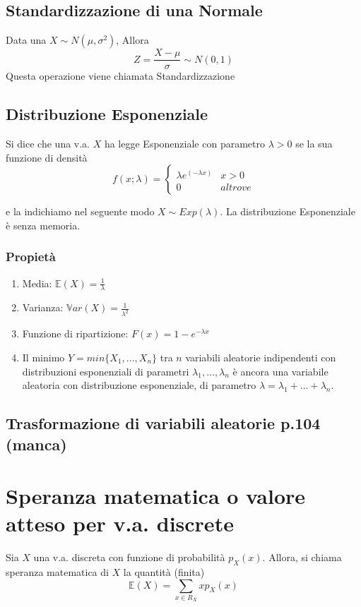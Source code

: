 \documentclass[a4paper]{report}
\begin{document}
  \subsection{Standardizzazione di una Normale}
  Data una $X \sim N(\mu,\sigma^2)$, Allora
  \[ Z = \frac{X-\mu}{\sigma} \sim N(0,1) \]
  Questa operazione viene chiamata Standardizzazione


  \subsection{Distribuzione Esponenziale}
  Si dice che una v.a. $X$ ha legge Esponenziale con parametro $\lambda >0$ se la sua funzione di densità
  \[
    f(x;\lambda) =
    \begin{cases}
      \lambda e^{(-\lambda x)} & x > 0 \\
      0 & altrove
    \end{cases}
  \]

  e la indichiamo nel seguente modo $X \sim Exp(\lambda)$. La distribuzione Esponenziale è senza memoria.
  \subsubsection{Propietà}
  \begin{enumerate}
    \item Media: $\mathbb{E}(X) = \frac{1}{\lambda}$
    \item Varianza: $\mathbb{V}ar(X) = \frac{1}{\lambda^2}$
    \item Funzione di ripartizione: $F(x) = 1-e^{-\lambda x}$
    \item Il minimo $Y = min\{X_1,...,X_n\} $ tra $n$ variabili aleatorie indipendenti con distribuzioni esponenziali di parametri $ \lambda_1,...,\lambda_n $ è ancora una variabile aleatoria con distribuzione esponenziale, di parametro $ \lambda = \lambda_1 + ... + \lambda_n$.
  \end{enumerate}


  \subsection{Trasformazione di variabili aleatorie p.104 (manca)}

  \section{Speranza matematica o valore atteso per v.a. discrete}
  Sia $X$ una v.a. discreta con funzione di probabilità $p_X(x)$. Allora, si chiama speranza matematica di $X$ la quantità (finita)
  \[ \mathbb{E}(X) = \sum_{x \in R_X} x p_X(x) \]\\
\end{document}
